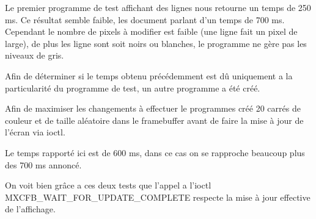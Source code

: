 Le premier programme de test affichant des lignes nous retourne un temps de 250 ms. Ce résultat semble faible, les document parlant d'un temps de 700 ms. Cependant le nombre de pixels à modifier est faible (une ligne fait un pixel de large), de plus les ligne sont soit noirs ou blanches, le programme ne gère pas les niveaux de gris.

Afin de déterminer si le temps obtenu précédemment est dû uniquement 
a la particularité du programme de test, un autre programme a été créé.

Afin de maximiser les changements à effectuer le programmes créé 20 carrés 
de couleur et de taille aléatoire dans le framebuffer avant de faire la mise à jour de l'écran via ioctl.

Le temps rapporté ici est de 600 ms, dans ce cas on se rapproche beaucoup plus des 700 ms annoncé.

On voit bien grâce a ces deux tests que l'appel a l'ioctl MXCFB_WAIT_FOR_UPDATE_COMPLETE  respecte la mise à jour effective de l'affichage. 